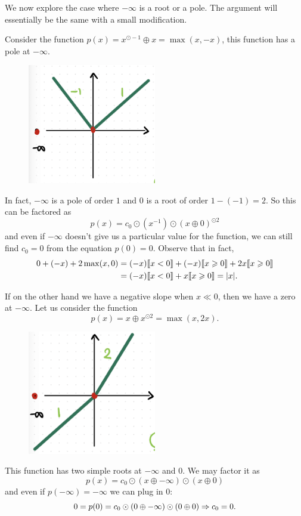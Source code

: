 \documentclass[12pt]{memoir}
\begin{document}
We now explore the case where $-\infty$ is a root or a pole. The argument will essentially be the same with a small modification.
\begin{Ex}
    Consider the function $p(x)=x^{\odot-1}\oplus x=\max(x,-x)$, this function has a pole at $-\infty$.
    \begin{figure}[h!]
        \centering
        \includegraphics[width=0.5\textwidth]{figs/fig4-2RootAndPoleProof.png}
        \label{fig:4.2-RootAndPoleProof}
    \end{figure}
    In fact, $-\infty$ is a pole of order $1$ and $0$ is a root of order $1-(-1)=2$. So this can be factored as 
    $$p(x)=c_0\odot(x^{-1})\odot(x\oplus 0)^{\odot 2}$$
    and even if $-\infty$ doesn't give us a particular value for the function, we can still find $c_0=0$ from the equation $p(0)=0$. Observe that in fact, 
    \begin{align*}
        0+(-x)+2\max(x,0)&=(-x)\llbracket x<0\rrbracket+(-x)\llbracket x\geqslant 0\rrbracket+2x\llbracket x\geqslant 0\rrbracket\\
        &=(-x)\llbracket x<0\rrbracket+x\llbracket x\geqslant 0\rrbracket=|x|.
    \end{align*}
\end{Ex}

\begin{Ex}
    If on the other hand we have a negative slope when $x\ll 0$, then we have a zero at $-\infty$. Let us consider the function 
    $$p(x)=x\oplus x^{\odot 2}=\max(x,2x).$$
    \begin{figure}[h!]
        \centering
        \includegraphics[width=0.5\textwidth]{figs/fig4-3RootsForProof.png}
        \label{fig:4.3-RootsForProof}
    \end{figure}
    This function has two simple roots at $-\infty$ and $0$. We may factor it as 
    $$p(x)=c_0\odot(x\oplus-\infty)\odot(x\oplus 0)$$
    and even if $p(-\infty)=-\infty$ we can plug in $0$:
    $$0=p(0)=c_0\odot(0\oplus-\infty)\odot(0\oplus 0)\Rightarrow c_0=0.$$
\end{Ex}
\end{document}
